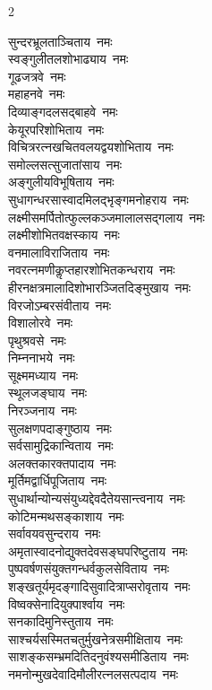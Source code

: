 \begin{multicols}{2}
\begin{flushleft}
सुन्दरभ्रूलताञ्चिताय~नमः\\
स्वङ्गुलीतलशोभाढ्याय~नमः\\
गूढजत्रवे~नमः\hfill{}\\
महाहनवे~नमः\\
दिव्याङ्गदलसद्बाहवे~नमः\\
केयूरपरिशोभिताय~नमः\\
विचित्ररत्नखचितवलयद्वय\-शोभिताय~नमः\\
समोल्लसत्सुजातांसाय~नमः\\
अङ्गुलीयविभूषिताय~नमः\\
सुधागन्धरसास्वादमिलद्भृङ्ग\-मनोहराय~नमः\\
लक्ष्मीसमर्पितोत्फुल्ल\-कञ्जमालालसद्गलाय~नमः\\
लक्ष्मीशोभितवक्षस्काय~नमः\\
वनमालाविराजिताय~नमः\hfill{}\\
नवरत्नमणीकॢप्तहारशोभित\-कन्धराय~नमः\\
हीरनक्षत्रमालादिशोभारञ्जित\-दिङ्मुखाय~नमः\\
विरजोऽम्बरसंवीताय~नमः\\
विशालोरवे~नमः\\
पृथुश्रवसे~नमः\\
निम्ननाभये~नमः\\
सूक्ष्ममध्याय~नमः\\
स्थूलजङ्घाय~नमः\\
निरञ्जनाय~नमः\\
सुलक्षणपदाङ्गुष्ठाय~नमः\hfill{}\\
सर्वसामुद्रिकान्विताय~नमः\\
अलक्तकारक्तपादाय~नमः\\
मूर्तिमद्वार्धिपूजिताय~नमः\\
सुधार्थान्योन्यसंयुध्यद्देवदैतेय\-सान्त्वनाय~नमः\\
कोटिमन्मथसङ्काशाय~नमः\\
सर्वावयवसुन्दराय~नमः\\
अमृतास्वादनोद्युक्तदेवसङ्घ\-परिष्टुताय~नमः\\
पुष्पवर्षणसंयुक्तगन्धर्वकुल\-सेविताय~नमः\\
शङ्खतूर्यमृदङ्गादि\-सुवादित्राप्सरोवृताय~नमः\\
विष्वक्सेनादियुक्पार्श्वाय~नमः\hfill{}\\
सनकादिमुनिस्तुताय~नमः\\
साश्चर्यसस्मितचतुर्मुखनेत्र\-समीक्षिताय~नमः\\
साशङ्कसम्भ्रमदितिदनुवंश्य\-समीडिताय~नमः\\
नमनोन्मुखदेवादिमौलीरत्न\-लसत्पदाय~नमः\\

\end{flushleft}
\end{multicols}
